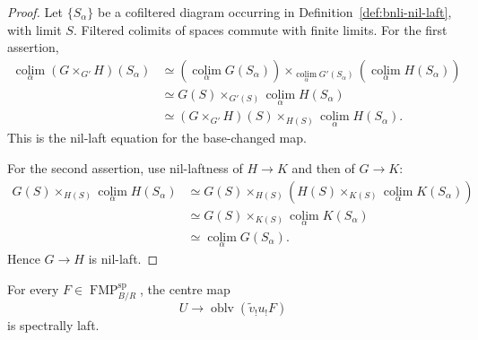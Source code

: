 \begin{proof}
Let $\{S_\alpha\}$ be a cofiltered diagram occurring in
Definition~\ref{def:bnli-nil-laft}, with limit $S$.  Filtered colimits of
spaces commute with finite limits.  For the first assertion,
\[
\begin{aligned}
\operatorname*{colim}_\alpha
(G\times_{G'}H)(S_\alpha)
&\simeq
\left(\operatorname*{colim}_\alpha G(S_\alpha)\right)
\times_{\operatorname*{colim}_\alpha G'(S_\alpha)}
\left(\operatorname*{colim}_\alpha H(S_\alpha)\right)\\
&\simeq
G(S)\times_{G'(S)}
\operatorname*{colim}_\alpha H(S_\alpha)\\
&\simeq
(G\times_{G'}H)(S)
\times_{H(S)}
\operatorname*{colim}_\alpha H(S_\alpha).
\end{aligned}
\]
This is the nil-laft equation for the base-changed map.

For the second assertion, use nil-laftness of $H\to K$ and then of
$G\to K$:
\[
\begin{aligned}
G(S)\times_{H(S)}
\operatorname*{colim}_\alpha H(S_\alpha)
&\simeq
G(S)\times_{H(S)}
\left(
H(S)\times_{K(S)}
\operatorname*{colim}_\alpha K(S_\alpha)
\right)\\
&\simeq
G(S)\times_{K(S)}
\operatorname*{colim}_\alpha K(S_\alpha)\\
&\simeq
\operatorname*{colim}_\alpha G(S_\alpha).
\end{aligned}
\]
Hence $G\to H$ is nil-laft.
\end{proof}

\begin{proposition}
\label{prop:bnli-two-stage-laft}
For every $F\in\operatorname{FMP}^{\mathrm{sp}}_{B/R}$, the centre map
\[
    U\longrightarrow
    \operatorname{oblv}(\widetilde v_!u_!F)
\]
is spectrally laft.
\end{proposition}

